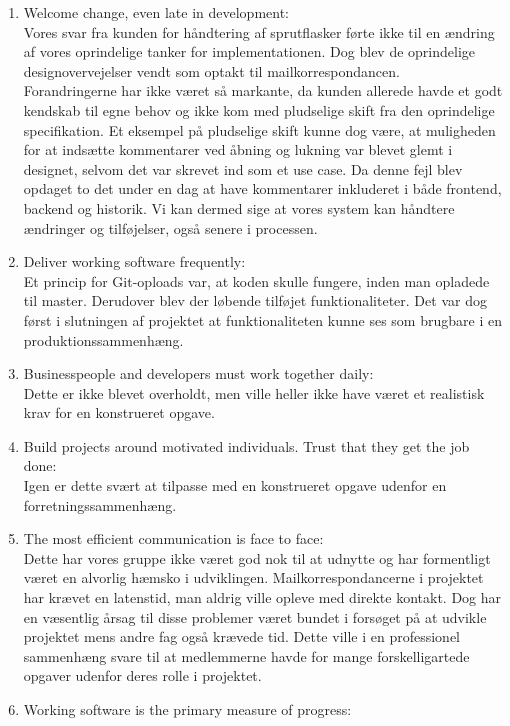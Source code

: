 \documentclass[]{article}
\begin{document}
\begin{enumerate}
    \item Welcome change, even late in development: \\
Vores svar fra kunden for håndtering af sprutflasker førte ikke til en ændring af vores oprindelige tanker for implementationen. Dog blev de oprindelige designovervejelser vendt som optakt til mailkorrespondancen. \\
Forandringerne har ikke været så markante, da kunden allerede havde et godt kendskab til egne behov og ikke kom med pludselige skift fra den oprindelige specifikation. Et eksempel på pludselige skift kunne dog være, at muligheden for at indsætte kommentarer ved åbning og lukning var blevet glemt i designet, selvom det var skrevet ind som et use case. Da denne fejl blev opdaget to det under en dag at have kommentarer inkluderet i både frontend, backend og historik. Vi kan dermed sige at vores system kan håndtere ændringer og tilføjelser, også senere i processen.
    \item Deliver working software frequently:\\
Et princip for Git-oploads var, at koden skulle fungere, inden man opladede til master. Derudover blev der løbende tilføjet funktionaliteter. Det var dog først i slutningen af projektet at funktionaliteten kunne ses som brugbare i en produktionssammenhæng. 
    \item Businesspeople and developers must work together daily: \\
Dette er ikke blevet overholdt, men ville heller ikke have været et realistisk krav for en konstrueret opgave. 
    \item Build projects around motivated individuals. Trust that they get the job done:\\
Igen er dette svært at tilpasse med en konstrueret opgave udenfor en forretningssammenhæng. 
    \item The most efficient communication is face to face: \\
Dette har vores gruppe ikke været god nok til at udnytte og har formentligt været en alvorlig hæmsko i udviklingen. Mailkorrespondancerne i projektet har krævet en latenstid, man aldrig ville opleve med direkte kontakt. Dog har en væsentlig årsag til disse problemer været bundet i forsøget på at udvikle projektet mens andre fag også krævede tid. Dette ville i en professionel sammenhæng svare til at medlemmerne havde for mange forskelligartede opgaver udenfor deres rolle i projektet.
    \item Working software is the primary measure of progress: \\

\end{enumerate}
\end{document}
